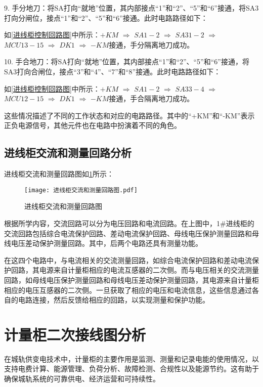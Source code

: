 9. 手分地刀：将SA打向“就地”位置，其内部接点“1”和“2”、“5”和“6”接通，将SA3打向分闸位，接点“1”和“2”、“5”和“6”接通。此时电路路径如下：

如\ref{进线柜控制回路图}中所示：$+KM$  $\Longrightarrow $    $SA1-2$  $\Longrightarrow $    $SA31-2$  $\Longrightarrow $    $MCU13-15$  $\Longrightarrow $    $DK1$  $\Longrightarrow $    $-KM$接通，手分隔离地刀成功。

10. 手合地刀：将SA打向“就地”位置，其内部接点“1”和“2”、“5”和“6”接通，将SA3打向合闸位，接点“3”和“4”、“7”和“8”接通。此时电路路径如下：

如\ref{进线柜控制回路图}中所示：$+KM$  $\Longrightarrow $    $SA1-2$  $\Longrightarrow $    $SA33-4$  $\Longrightarrow $    $MCU12-15$  $\Longrightarrow $    $DK1$  $\Longrightarrow $    $-KM$接通，手合隔离地刀成功。

这些情况描述了不同的工作状态和对应的电路路径。其中的“+KM”和“-KM”表示正负电源信号，其他元件也在电路中扮演着不同的角色。

\subsection{进线柜交流和测量回路分析}
进线柜交流和测量回路图如\ref{进线柜交流和测量回路图}所示：
\begin{figure}[h]
	\centering
	\texttt{[image: 进线柜交流和测量回路图.pdf]}
	\caption{进线柜交流和测量回路图}
	\label{进线柜交流和测量回路图}
\end{figure}
根据所学内容，交流回路可以分为电压回路和电流回路。在上图中，1\#进线柜的交流回路包括综合电流保护回路、差动电流保护回路、母线电压保护测量回路和母线电压差动保护测量回路。其中，后两个电路还具有测量功能。

在这四个电路中，与电流相关的交流测量回路，如综合电流保护回路和差动电流保护回路，其电源来自计量柜相应的电流互感器的二次侧。而与电压相关的交流测量回路，如母线电压保护测量回路和母线电压差动保护测量回路，其电源来自计量柜相应的电压互感器的二次侧。一旦获取了相应的电压和电流信息，这些信息通过各自的电路连接，然后反馈给相应的回路，以实现测量和保护功能。

\section{计量柜二次接线图分析}

在城轨供变电技术中，计量柜的主要作用是监测、测量和记录电能的使用情况，以支持电费计算、能源管理、负荷分析、故障检测、合规性以及能源节约。这有助于确保城轨系统的可靠供电、经济运营和可持续性。

